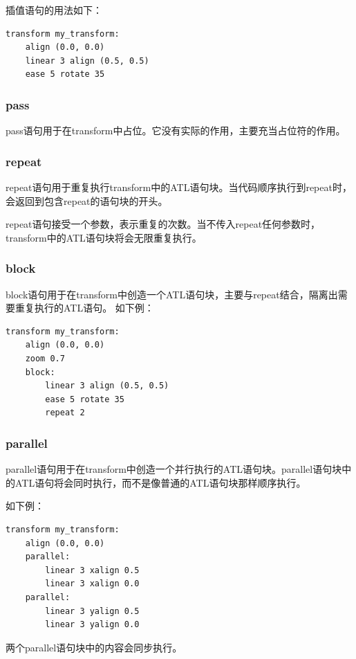 \documentclass[../../Main.tex]{subfiles}
\begin{document}
插值语句的用法如下：
\begin{lstlisting}
transform my_transform:
    align (0.0, 0.0)
    linear 3 align (0.5, 0.5)
    ease 5 rotate 35
\end{lstlisting}

\subsubsection{pass}
pass语句用于在transform中占位。它没有实际的作用，主要充当占位符的作用。

\subsubsection{repeat}
repeat语句用于重复执行transform中的ATL语句块。当代码顺序执行到repeat时，会返回到包含repeat的语句块的开头。

repeat语句接受一个参数，表示重复的次数。当不传入repeat任何参数时，transform中的ATL语句块将会无限重复执行。

\subsubsection{block}
block语句用于在transform中创造一个ATL语句块，主要与repeat结合，隔离出需要重复执行的ATL语句。
如下例：

\begin{lstlisting}
transform my_transform:
    align (0.0, 0.0)
    zoom 0.7
    block:
        linear 3 align (0.5, 0.5)
        ease 5 rotate 35
        repeat 2
\end{lstlisting}

\subsubsection{parallel}
parallel语句用于在transform中创造一个并行执行的ATL语句块。parallel语句块中的ATL语句将会同时执行，而不是像普通的ATL语句块那样顺序执行。

如下例：

\begin{lstlisting}
transform my_transform:
    align (0.0, 0.0)
    parallel:
        linear 3 xalign 0.5
        linear 3 xalign 0.0
    parallel:
        linear 3 yalign 0.5
        linear 3 yalign 0.0
\end{lstlisting}

两个parallel语句块中的内容会同步执行。
\end{document}
